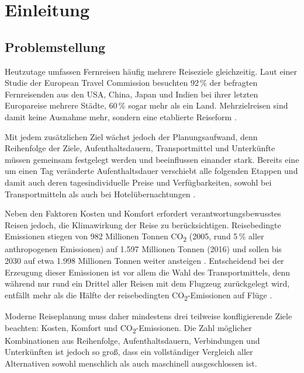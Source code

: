 \section{Einleitung}

\subsection{Problemstellung}

Heutzutage umfassen Fernreisen häufig mehrere Reiseziele gleichzeitig. Laut einer Studie der European Travel Commission besuchten 92\,\% der befragten Fernreisenden aus den USA, China, Japan und Indien bei ihrer letzten Europareise mehrere Städte, 60\,\% sogar mehr als ein Land. Mehrzielreisen sind damit keine Ausnahme mehr, sondern eine etablierte Reiseform \cite[7, 11]{etcTrackingMultiDestinationTravel2018}.

Mit jedem zusätzlichen Ziel wächst jedoch der Planungsaufwand, denn Reihenfolge der Ziele, Aufenthaltsdauern, Transportmittel und Unterkünfte müssen gemeinsam festgelegt werden und beeinflussen einander stark. Bereits eine um einen Tag veränderte Aufenthaltsdauer verschiebt alle folgenden Etappen und damit auch deren tagesindividuelle Preise und Verfügbarkeiten, sowohl bei Transportmitteln \cite{mantinKooWeekendEffect2010} als auch bei Hotelübernachtungen \cite{schamelWeekendMidweekHotel2012}.

Neben den Faktoren Kosten und Komfort erfordert verantwortungsbewusstes Reisen jedoch, die Klimawirkung der Reise zu berücksichtigen. Reisebedingte Emissionen stiegen von 982 Millionen Tonnen CO\textsubscript{2} (2005, rund 5\,\% aller anthropogenen Emissionen) auf 1.597 Millionen Tonnen (2016) und sollen bis 2030 auf etwa 1.998 Millionen Tonnen weiter ansteigen \cite[49]{unwtoTransportrelatedCO2Emissions2019}. Entscheidend bei der Erzeugung dieser Emissionen ist vor allem die Wahl des Transportmittels, denn während nur rund ein Drittel aller Reisen mit dem Flugzeug zurückgelegt wird, entfällt mehr als die Hälfte der reisebedingten CO\textsubscript{2}-Emissionen auf Flüge \cite[46]{unwtoTransportrelatedCO2Emissions2019}.

Moderne Reiseplanung muss daher mindestens drei teilweise konfligierende Ziele beachten: Kosten, Komfort und CO\textsubscript{2}-Emissionen. Die Zahl möglicher Kombinationen aus Reihenfolge, Aufenthaltsdauern, Verbindungen und Unterkünften ist jedoch so groß, dass ein vollständiger Vergleich aller Alternativen sowohl menschlich als auch maschinell ausgeschlossen ist.

